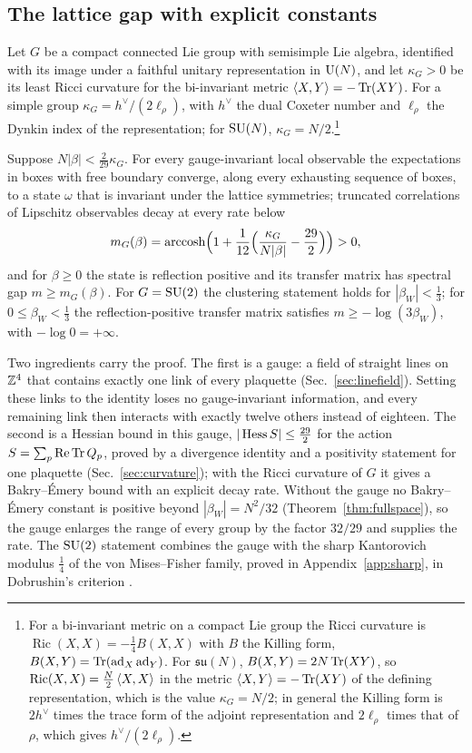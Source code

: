 \subsection{The lattice gap with explicit constants}

Let $G$ be a compact connected Lie group with semisimple Lie algebra,
identified with its image under a faithful unitary representation in $\mathrm{U}(N)$,
and let $\kappa_G>0$ be its least Ricci curvature for the bi-invariant metric
$\langle X,Y\rangle=-\operatorname{Tr}(XY)$. For a simple group $\kappa_G=h^\vee/(2\ell_\rho)$, with $h^\vee$
the dual Coxeter number and $\ell_\rho$ the Dynkin index of the representation;
for $\mathrm{SU}(N)$, $\kappa_G=N/2$.\footnote{For a bi-invariant metric on a compact
Lie group the Ricci curvature is $\operatorname{Ric}(X,X)=-\frac14B(X,X)$
with $B$ the Killing form, $B(X,Y)=\operatorname{Tr}(\operatorname{ad}_X\operatorname{ad}_Y)$.
For $\mathfrak{su}(N)$, $B(X,Y)=2N\operatorname{Tr}(XY)$, so $\operatorname{Ric}(X,X)=
\frac N2\,\langle X,X\rangle$ in the metric $\langle X,Y\rangle=-\operatorname{Tr}(XY)$ of the defining
representation, which is the value $\kappa_G=N/2$; in general the Killing form
is $2h^\vee$ times the trace form of the adjoint representation and
$2\ell_\rho$ times that of $\rho$, which gives $h^\vee/(2\ell_\rho)$.}

\begin{mainthm}\label{thm:A}
Suppose $N|\beta|<\frac2{29}\kappa_G$. For every gauge-invariant local
observable the expectations in boxes with free boundary converge, along every
exhausting sequence of boxes, to a state $\omega$ that is invariant under the
lattice symmetries; truncated correlations of Lipschitz observables decay at
every rate below
\[
m_G(\beta)=\operatorname{arccosh}\Bigl(1+\frac1{12}\Bigl(\frac{\kappa_G}{N|\beta|}
-\frac{29}2\Bigr)\Bigr)>0 ,
\]
and for $\beta\ge0$ the state is reflection positive and its transfer matrix
has spectral gap $m\ge m_G(\beta)$. For $G=\mathrm{SU}(2)$ the clustering statement holds for
$|\beta_W|<\frac13$; for $0\le\beta_W<\frac13$ the reflection-positive
transfer matrix satisfies $m\ge-\log(3\beta_W)$, with $-\log0=+\infty$.
\end{mainthm}

Two ingredients carry the proof. The first is a gauge: a field of straight
lines on $\mathbb{Z}^4$ that contains exactly one link of every plaquette
(Sec.~\ref{sec:linefield}). Setting these links to the identity loses no
gauge-invariant information, and every remaining link then interacts with
exactly twelve others instead of eighteen. The second is a Hessian bound in
this gauge, $|\operatorname{Hess} S|\le\frac{29}2$ for the action $S=\sum_p\operatorname{Re}\operatorname{Tr} Q_p$, proved
by a divergence identity and a positivity statement for one plaquette
(Sec.~\ref{sec:curvature}); with the Ricci curvature of $G$ it gives a
Bakry--\'Emery bound \cite{BE85,BGL14} with an explicit decay rate. Without
the gauge no Bakry--\'Emery constant is positive beyond $|\beta_W|=N^2/32$
(Theorem~\ref{thm:fullspace}), so the gauge enlarges the range of every group
by the factor $32/29$ and supplies the rate. The $\mathrm{SU}(2)$ statement combines
the gauge with the sharp Kantorovich modulus $\frac14$ of the von
Mises--Fisher family, proved in Appendix~\ref{app:sharp}, in Dobrushin's
criterion \cite{Dob68,Dob70}.

